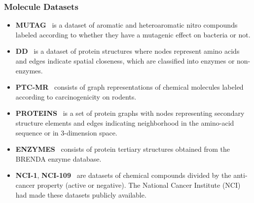 \documentclass[10pt,journal,compsoc]{IEEEtran}
\begin{document}
\subsubsection{Molecule Datasets}
\begin{itemize}
  \item \textbf{MUTAG}~\cite{dataset-mutag} is a dataset of aromatic and heteroaromatic nitro compounds labeled according to whether they have a mutagenic effect on bacteria or not.
  \item \textbf{DD}~\cite{dataset-dd} is a dataset of protein structures where nodes represent amino acids and edges indicate spatial closeness, which are classiﬁed into enzymes or non-enzymes.
  \item \textbf{PTC-MR}~\cite{dataset-ptc-mr} consists of graph representations of chemical molecules labeled according to carcinogenicity on rodents.
  \item \textbf{PROTEINS}~\cite{dataset-protein} is a set of protein graphs with nodes representing secondary structure elements and edges indicating neighborhood in the amino-acid sequence or in 3-dimension space.
  \item \textbf{ENZYMES}~\cite{dataset-protein} consists of protein tertiary structures obtained from the BRENDA enzyme database.
  \item \textbf{NCI-1}, \textbf{NCI-109}~\cite{dataset-nci} are datasets of chemical compounds divided by the anti-cancer property (active or negative). The National Cancer Institute (NCI) had made these datasets publicly available.
\end{itemize}
\end{document}

